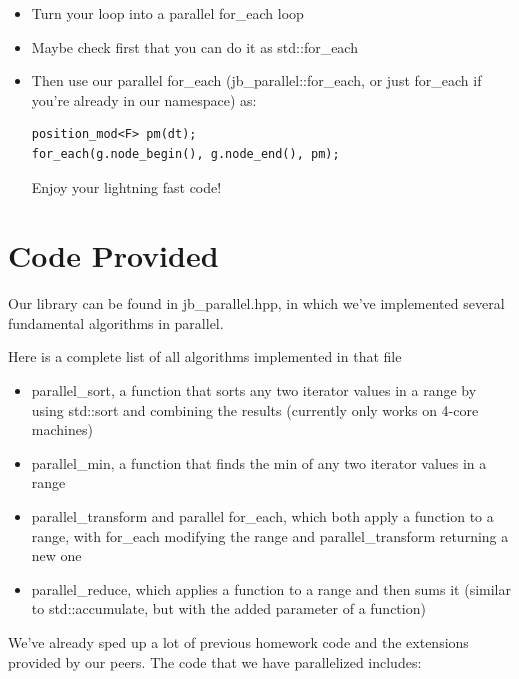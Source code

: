 \documentclass{article}
\begin{document}
\begin{itemize}
\item Turn your loop into a parallel for\_each loop
\item Maybe check first that you can do it as std::for\_each
\item Then use our parallel for\_each (jb\_parallel::for\_each, or just for\_each if you're already in our namespace) as:
\begin{verbatim}
position_mod<F> pm(dt);
for_each(g.node_begin(), g.node_end(), pm);
\end{verbatim}
Enjoy your lightning fast code!
\end{itemize}

\section{Code Provided}

Our library can be found in jb\_parallel.hpp, in which we've implemented several fundamental algorithms in parallel. 

Here is a complete list of all algorithms implemented in that file

\begin{itemize}
\item parallel\_sort, a function that sorts any two iterator values in a range by using std::sort and combining the results (currently only works on 4-core machines)
\item parallel\_min, a function that finds the min of any two iterator values in a range \item parallel\_transform and parallel for\_each, which both apply a function to a range, with for\_each modifying the range and parallel\_transform returning a new one
\item parallel\_reduce, which applies a function to a range and then sums it (similar to std::accumulate, but with the added parameter of a function)
\end{itemize}

We've already sped up a lot of previous homework code and the extensions provided by our peers. 
The code that we have parallelized includes:
\end{document}
